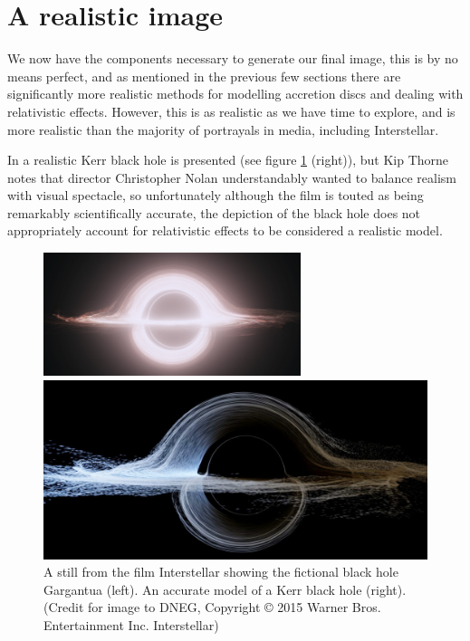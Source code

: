 \documentclass[oneside,openright,frontopenright, singlespacing]{dmathesis}
\begin{document}
\section{A realistic image}\label{sec:Section5.3}

	We now have the components necessary to generate our final image, this is by no means perfect, and as mentioned in the previous few sections there are significantly more realistic methods for modelling accretion discs and dealing with relativistic effects. However, this is as realistic as we have time to explore, and is more realistic than the majority of portrayals in media, including Interstellar. 

\vspace{1em}
	In \cite{thorne2015gravitational} a realistic Kerr black hole is presented (see figure \ref{fig:Figure5.4} (right)), but  Kip Thorne notes that director Christopher Nolan understandably wanted to balance realism with visual spectacle, so unfortunately although the film is touted as being remarkably scientifically accurate, the depiction of the black hole does not appropriately account for relativistic effects to be considered a realistic model.

\vspace{1em}
\begin{figure}[!ht]
	\centering
	\begin{minipage}{0.5\textwidth}
		\centering
		\includegraphics[width=0.9\linewidth]{img/used-kerr}
	\end{minipage}%
	\hfill
	\begin{minipage}{0.5\textwidth}
		\centering
		\includegraphics[width=0.9\linewidth]{img/realistic-kerr}
	\end{minipage}
	\caption{A still from the film Interstellar showing the fictional black hole Gargantua (left). An accurate model of a Kerr black hole (right). (Credit for image to DNEG, Copyright ©  2015 Warner Bros. Entertainment Inc. Interstellar)}
	\label{fig:Figure5.4}
\end{figure}
\end{document}
